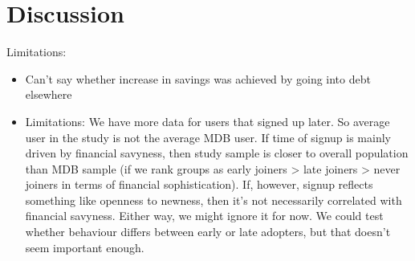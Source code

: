 
\section{Discussion}%
\label{sec:discussion}

Limitations:
\begin{itemize}
    \item Can't say whether increase in savings was achieved by going into
        debt elsewhere

    \item Limitations: We have more data for users that signed up later. So average user in
        the study is not the average MDB user. If time of signup is mainly
        driven by financial savyness, then study sample is closer to overall
        population than MDB sample (if we rank groups as early joiners > late
        joiners > never joiners in terms of financial sophistication). If,
        however, signup reflects something like openness to newness, then it's
        not necessarily correlated with financial savyness. Either way, we
        might ignore it for now. We could test whether behaviour differs
        between early or late adopters, but that doesn't seem important enough.

\end{itemize}
